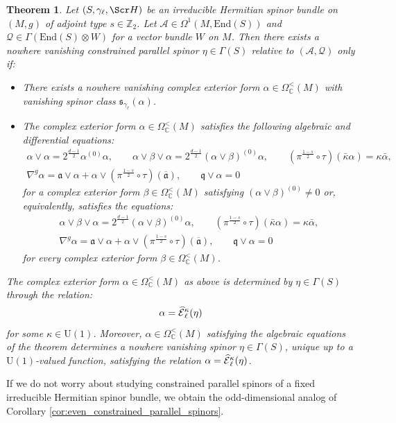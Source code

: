\documentclass[10pt,a4paper,twoside,reqno]{amsart}
\theoremstyle{plain}
\newtheorem{thm}{Theorem}[section]
\theoremstyle{definition}
\theoremstyle{remark}
\newcommand{\End}{\mathrm{End}}
\def\Z{\mathbb{Z}}
\def\C{\mathbb{C}}
\def\cQ{\mathcal{Q}}
\def\fra{\mathfrak{a}}
\def\frq{\mathfrak{q}}
\def\scS{\Scr H}
\def\U{\mathrm{U}}
\def\cA{\mathcal{A}}
\def\hcE{\smash{\widehat{\mathcal{E}}}}
\begin{document}
\begin{thm}\label{thm:odd_constrained_parallel_spinors}
Let $(S,\gamma_\ell,\scS)$ be an irreducible Hermitian spinor bundle on $(M,g)$ of adjoint type $s\in\Z_2$. Let $\cA\in\Omega^1(M,\End(S))$ and $\cQ\in\Gamma(\End(S)\otimes W)$ for a vector bundle $W$ on $M$. Then there exists a nowhere vanishing constrained parallel spinor $\eta\in\Gamma(S)$ relative to $(\cA,\cQ)$ only if: \begin{itemize}
\item There exists a nowhere vanishing complex exterior form $\alpha\in\Omega^<_\C(M)$ with vanishing spinor class $\mathfrak{s}_{\gamma_{\ell}}(\alpha)$.
\item The complex exterior form $\alpha\in\Omega^<_\C(M)$ satisfies the following algebraic and differential equations: \begin{gather*}
\alpha\vee\alpha = 2^{\frac{d-1}{2}}\alpha^{(0)}\alpha,\qquad \alpha\vee\beta\vee\alpha=2^{\frac{d-1}{2}}(\alpha\vee\beta)^{(0)}\alpha,\qquad(\pi^{\frac{1-s}{2}}\circ\tau)(\bar\kappa\alpha) = \kappa \bar{\alpha},\\
\nabla^g\alpha=\fra\vee\alpha+\alpha\vee(\pi^{\frac{1-s}{2}}\circ\tau)(\overline{\fra}),\qquad\frq\vee\alpha=0
\end{gather*} 
for a complex exterior form $\beta\in\Omega^<_\C(M)$ satisfying $(\alpha\vee\beta)^{(0)}\neq0$ or, equivalently, satisfies the equations: 
\begin{gather*}
\alpha \vee \beta \vee \alpha=2^{\frac{d-1}{2}}(\alpha\vee\beta)^{(0)}\alpha,\qquad(\pi^{\frac{1-s}{2}}\circ\tau)(\bar\kappa\alpha) = \kappa \bar{\alpha},\\
\nabla^g\alpha=\fra\vee\alpha+\alpha\vee(\pi^{\frac{1-s}{2}}\circ\tau)(\overline{\fra}),\qquad\frq\vee\alpha=0
\end{gather*} 
for every complex exterior form $\beta\in\Omega^<_\C(M)$.
\end{itemize}
    
The complex exterior form $\alpha\in\Omega^<_\C(M)$ as above is determined by $\eta\in\Gamma(S)$ through the relation: $$\alpha=\hcE^\kappa_\ell(\eta)$$ for some $\kappa\in\U(1)$. Moreover, $\alpha\in\Omega^<_\C(M)$ satisfying the algebraic equations of the theorem determines a nowhere vanishing spinor $\eta\in\Gamma(S)$, unique up to a $\U(1)$-valued function, satisfying the relation $\alpha=\hcE^\kappa_\ell(\eta)$.
\end{thm}

If we do not worry about studying constrained parallel spinors of a fixed irreducible Hermitian spinor bundle, we obtain the odd-dimensional analog of Corollary \ref{cor:even_constrained_parallel_spinors}.
\end{document}
